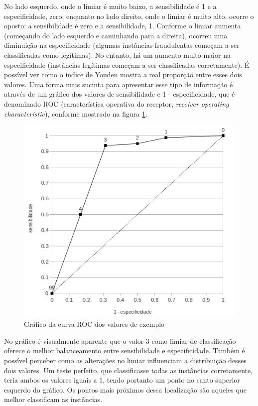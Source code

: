 No lado esquerdo, onde o limiar é muito baixo, a sensibilidade é 1 e a especificidade, zero; enquanto no lado direito, onde o limiar é muito alto, ocorre o oposto: a sensibilidade é zero e a sensibilidade, 1. Conforme o limiar aumenta (começando do lado esquerdo e caminhando para a direita), ocorreu uma diminuição na especificidade (algumas instâncias fraudulentas começam a ser classificadas como legítimas). No entanto, há um aumento muito maior na especificidade (instâncias legítimas começam a ser classificadas corretamente). É possível ver como o índice de Youden mostra a real proporção entre esses dois valores. Uma forma mais sucinta para apresentar esse tipo de informação é através de um gráfico dos valores de sensibilidade e 1 - especificidade, que é denominado ROC (característica operativa do receptor, \emph{receiver operating characteristic}), conforme mostrado na figura \ref{fraud:roc}.

\vspace{0.5cm}
\begin{figure}[h!]
    \centering
    \caption{Gráfico da curva ROC dos valores de exemplo}
    \label{fraud:roc}
    \vspace{0.5cm}
    \includegraphics[scale=0.5]{img/roc.png}
\end{figure}
\vspace{0.5cm}

No gráfico é visualmente aparente que o valor 3 como limiar de classificação oferece o melhor balanceamento entre sensibilidade e especificidade. Também é possível perceber como as alterações no limiar influenciam a distribuição desses dois valores. Um teste perfeito, que classificasse todas as instâncias corretamente, teria ambos os valores iguais a 1, tendo portanto um ponto no canto superior esquerdo do gráfico. Os pontos mais próximos dessa localização são aqueles que melhor classificam as instâncias.

